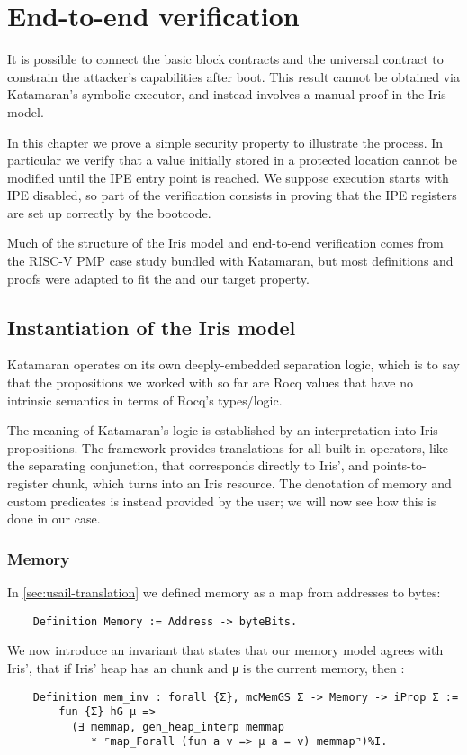 \chapter{End-to-end verification}
\label{ch:end-to-end}

It is possible to connect the basic block contracts and the universal contract to constrain the attacker's capabilities after boot. This result cannot be obtained via Katamaran's symbolic executor, and instead involves a manual proof in the Iris model.

In this chapter we prove a simple security property to illustrate the process. In particular we verify that a value initially stored in a protected location cannot be modified until the IPE entry point is reached. We suppose execution starts with IPE disabled, so part of the verification consists in proving that the IPE registers are set up correctly by the bootcode.

Much of the structure of the Iris model and end-to-end verification comes from the RISC-V PMP case study bundled with Katamaran, but most definitions and proofs were adapted to fit the \msp and our target property.

\section{Instantiation of the Iris model}

Katamaran operates on its own deeply-embedded separation logic, which is to say that the propositions we worked with so far are Rocq values that have no intrinsic semantics in terms of Rocq's types/logic.

The meaning of Katamaran's logic is established by an interpretation into Iris propositions. The framework provides translations for all built-in operators, like the separating conjunction, that corresponds directly to Iris', and points-to-register chunk, which turns into an Iris resource. The denotation of memory and custom predicates is instead provided by the user; we will now see how this is done in our case.

\subsection{Memory}

In \cref{sec:usail-translation} we defined memory as a map from addresses to bytes:
\begin{verbatim}
    Definition Memory := Address -> byteBits.
\end{verbatim}
We now introduce an invariant that states that our memory model agrees with Iris', \ie that if Iris' heap has an  chunk and \texttt{μ} is the current memory, then :
\begin{verbatim}
    Definition mem_inv : forall {Σ}, mcMemGS Σ -> Memory -> iProp Σ :=
        fun {Σ} hG μ =>
          (∃ memmap, gen_heap_interp memmap
             * ⌜map_Forall (fun a v => μ a = v) memmap⌝)%I.
\end{verbatim}

